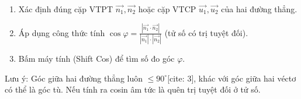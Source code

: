 \begin{enumerate}
\item Xác định đúng cặp VTPT $\overrightarrow{n_1}, \overrightarrow{n_2}$ hoặc cặp VTCP $\overrightarrow{u_1}, \overrightarrow{u_2}$ của hai đường thẳng.
\item Áp dụng công thức tính $\cos \varphi = \frac{|\overrightarrow{n_1} \cdot \overrightarrow{n_2}|}{|\overrightarrow{n_1}| \cdot |\overrightarrow{n_2}|}$ (tử số có trị tuyệt đối).
\item Bấm máy tính (Shift Cos) để tìm số đo góc $\varphi$.
\end{enumerate}
Lưu ý: Góc giữa hai đường thẳng luôn $\le 90^\circ$[cite: 3], khác với góc giữa hai véctơ có thể là góc tù. Nếu tính ra cosin âm tức là quên trị tuyệt đối ở tử số.
